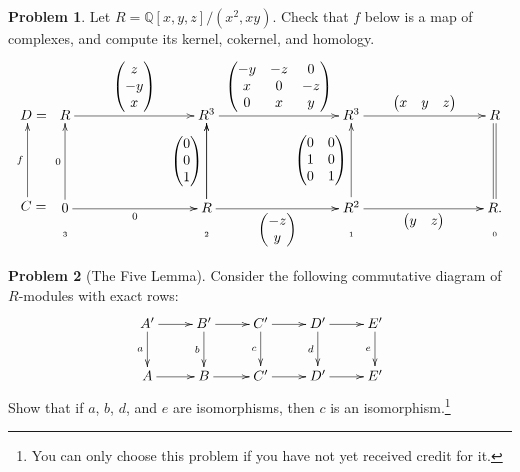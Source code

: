 \documentclass[11pt]{article}
\theoremstyle{definition}
\newtheorem{problem}{Problem}
\begin{document}
\begin{problem}
	Let $R = \mathbb{Q}[x,y,z]/(x^2,xy)$. Check that $f$ below is a map of complexes, and compute its kernel, cokernel, and homology.
	$$\xymatrix@R=2mm{D = \\ \\ \\ \\ \\ C = \ar@<1ex>[uuuuu]^-f} \xymatrix@R=2mm@C=30mm{R \ar[r]^-{\begin{pmatrix} z \\ -y \\ x \end{pmatrix}} & R^3 \ar[r]^-{\begin{pmatrix} -y & -z & 0 \\ x & 0 & -z \\ 0 & x & y \end{pmatrix}
} & R^3 \ar[r]^-{\begin{pmatrix} x & y & z\end{pmatrix}
} & R \\ &&&\\ &&&\\ &&&\\ &&&\\ 0 \ar[r]_-0 \ar[uuuuu]^-{0} & R \ar[uuuuu]^-{\begin{pmatrix} 0 \\ 0 \\ 1 \end{pmatrix}} \ar[r]_-{\begin{pmatrix} -z \\ y \end{pmatrix}}  \ar[uuuuu]^-{} & R^2 \ar[uuuuu]^-{\begin{pmatrix} 0 & 0 \\ 1 & 0 \\ 0 & 1 \end{pmatrix}} \ar[r]_-{\begin{pmatrix} y & z\end{pmatrix}} & R. \ar@{=}[uuuuu] \\
\text{{\tiny 3}} & \text{{\tiny 2}} & \text{{\tiny 1}} & \text{{\tiny 0}}}$$

\end{problem}



\begin{problem}[The Five Lemma]
	Consider the following commutative diagram of $R$-modules with exact rows:
	$$\xymatrix{A' \ar[d]_-a \ar[r] & B' \ar[r] \ar[d]_-b & C' \ar[r] \ar[d]_-c & D' \ar[d]_-d \ar[r] & E' \ar[d]_-e \\
	A \ar[r] & B \ar[r] & C' \ar[r] & D' \ar[r] & E'}$$
	Show that if $a$, $b$, $d$, and $e$ are isomorphisms, then $c$ is an isomorphism.\footnote{You can only choose this problem if you have not yet received credit for it.}
\end{problem}
\end{document}
